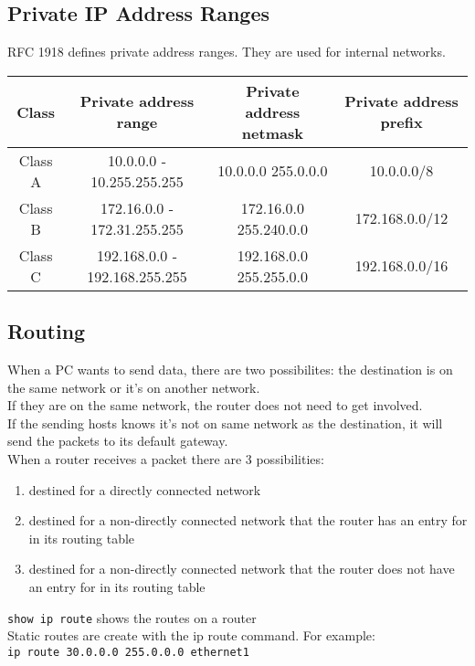 \subsection{Private IP Address Ranges}

RFC 1918 defines private address ranges. They are used for internal networks.\\

\begin{tabular}{ | c | c | c | c | }
\hline
Class & Private address range & Private address netmask & Private address prefix \\ \hline
Class A & 10.0.0.0 - 10.255.255.255 & 10.0.0.0 255.0.0.0 & 10.0.0.0/8 \\ \hline
Class B & 172.16.0.0 - 172.31.255.255 & 172.16.0.0 255.240.0.0 & 172.168.0.0/12 \\ \hline
Class C & 192.168.0.0 - 192.168.255.255 & 192.168.0.0 255.255.0.0 & 192.168.0.0/16 \\ \hline
\end{tabular}

\subsection{Routing}

When a PC wants to send data, there are two possibilites: the destination
is on the same network or it's on another network.\\

If they are on the same network, the router does not need to get involved.\\

If the sending hosts knows it's not on same network as the destination, it will
send the packets to its default gateway.\\

When a router receives a packet there are 3 possibilities:

\begin{enumerate}

\item destined for a directly connected network
\item destined for a non-directly connected network that the router has an
entry for in its routing table
\item destined for a non-directly connected network that the router does not
have an entry for in its routing table

\end{enumerate}

\texttt{show ip route} shows the routes on a router\\

Static routes are create with the ip route command. For example:\\

\texttt{ip route 30.0.0.0 255.0.0.0 ethernet1}\\

